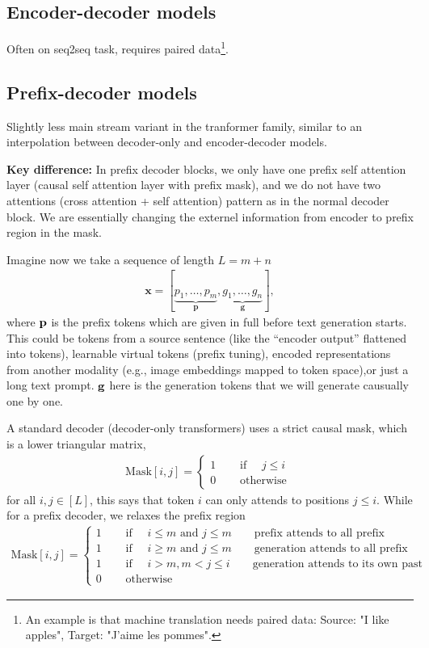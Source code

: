 \documentclass[11pt]{article}  %
\begin{document}
\subsection{Encoder-decoder models}
Often on seq2seq task, requires paired data\footnote{An example is that machine translation needs paired data: Source: "I like apples", Target: "J'aime les pommes".}.


\subsection{Prefix-decoder models}
Slightly less main stream variant in the tranformer family, similar to an interpolation between decoder-only and encoder-decoder models.

\textbf{Key difference:} In prefix decoder blocks, we only have one prefix self attention layer (causal self attention layer with prefix mask), and we do not have two attentions (cross attention + self attention) pattern as in the normal decoder block.
We are essentially changing the externel information from encoder to prefix region in the mask.


Imagine now we take a sequence of length $L = m + n$
\begin{align*}
  \textbf{x} = [\underbrace{p_1, \hdots, p_m}_{\textbf{p}}, \underbrace{g_1, \hdots, g_n}_{\textbf{g}}],
\end{align*}
where $\mathbf{p}$ is the prefix tokens which are given in full before text generation starts.
This could be tokens from a source sentence (like the ``encoder output'' flattened into tokens), learnable virtual tokens (prefix tuning), encoded representations from another modality (e.g., image embeddings mapped to token space),or just a long text prompt. $\mathbf{g}$ here is the generation tokens that we will generate causually one by one.

A standard decoder (decoder-only transformers) uses a strict causal mask, which is a lower triangular matrix,
\begin{align*}
  \text{Mask}[i, j] = \begin{cases}
    1 &\quad \text{ if } \quad j \leq i \\
    0 &\quad \text{ otherwise }
  \end{cases}
\end{align*}
for all $i, j \in [L]$, this says that token $i$ can only attends to positions $j \leq i$.
While for a prefix decoder, we relaxes the prefix region 
\begin{align*}
  \text{Mask}[i, j] = \begin{cases}
    1 & \quad \text{ if } \quad i \leq m \text{ and } j \leq m \qquad \text{prefix attends to all prefix} \\
    1 & \quad \text{ if } \quad i \geq m \text{ and } j \leq m \qquad \text{generation attends to all prefix} \\
    1 & \quad \text{ if } \quad i > m, m < j \leq i \qquad \text{generation attends to its own past}\\
    0 & \quad \text{ otherwise }
  \end{cases}
\end{align*}
\end{document}
